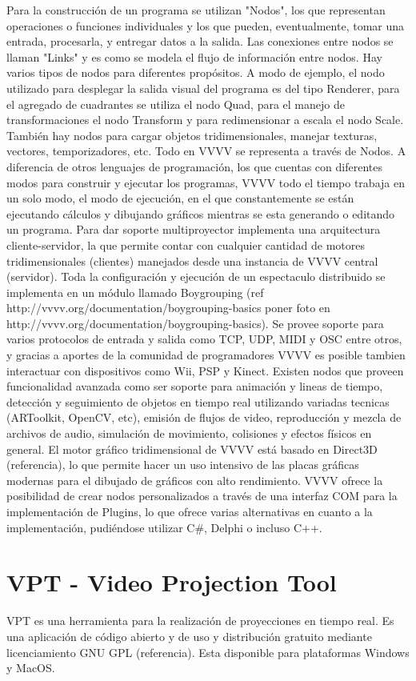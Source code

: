 Para la construcción de un programa se utilizan "Nodos", los que representan operaciones o funciones individuales y los que pueden, eventualmente, tomar una entrada, procesarla, y entregar datos a la salida. Las conexiones entre nodos se llaman "Links" y es como se modela el flujo de información entre nodos. Hay varios tipos de nodos para diferentes propósitos. A modo de ejemplo, el nodo utilizado para desplegar la salida visual del programa es del tipo Renderer, para el agregado de cuadrantes se utiliza el nodo Quad, para el manejo de transformaciones el nodo Transform y para redimensionar a escala el nodo Scale. También hay nodos para cargar objetos tridimensionales, manejar texturas, vectores, temporizadores, etc. Todo en VVVV se representa a través de Nodos.
A diferencia de otros lenguajes de programación, los que cuentas con diferentes modos para construir y ejecutar los programas, VVVV todo el tiempo trabaja en un solo modo, el modo de ejecución, en el que constantemente se están ejecutando cálculos y dibujando gráficos mientras se esta generando o editando un programa.
Para dar soporte multiproyector implementa una arquitectura cliente-servidor, la que permite contar con cualquier cantidad de motores tridimensionales (clientes) manejados desde una instancia de VVVV central (servidor). Toda la configuración y ejecución de un espectaculo distribuido se implementa en un módulo llamado Boygrouping (ref http://vvvv.org/documentation/boygrouping-basics poner foto en http://vvvv.org/documentation/boygrouping-basics).
Se provee soporte para varios protocolos de entrada y salida como TCP, UDP, MIDI y OSC entre otros, y gracias a aportes de la comunidad de programadores VVVV es posible tambien interactuar con dispositivos como Wii, PSP y Kinect. Existen nodos que proveen funcionalidad avanzada como ser soporte para animación y lineas de tiempo, detección y seguimiento de objetos en tiempo real utilizando variadas tecnicas (ARToolkit, OpenCV, etc), emisión de flujos de video, reproducción y mezcla de archivos de audio, simulación de movimiento, colisiones y efectos físicos en general.
El motor gráfico tridimensional de VVVV está basado en Direct3D (referencia), lo que permite hacer un uso intensivo de las placas gráficas modernas para el dibujado de gráficos con alto rendimiento.
VVVV ofrece la posibilidad de crear nodos personalizados a través de una interfaz COM para la implementación de Plugins, lo que ofrece varias alternativas en cuanto a la implementación, pudiéndose utilizar C\#, Delphi o incluso C++.
\section{VPT - Video Projection Tool}
VPT\cite{VPT} es una herramienta para la realización de proyecciones en tiempo real. Es una aplicación de código abierto y de uso y distribución gratuito mediante licenciamiento GNU GPL (referencia). Esta disponible para plataformas Windows y MacOS.


